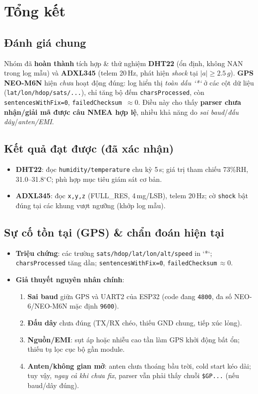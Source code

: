 \section{Tổng kết}

\subsection*{Đánh giá chung}
Nhóm đã \textbf{hoàn thành} tích hợp \& thử nghiệm \textbf{DHT22} (ổn định, không NAN trong log mẫu) và \textbf{ADXL345} (telem 20\,Hz, phát hiện \emph{shock} tại $|a|\ge 2.5\,g$). 
\textbf{GPS NEO-M6N} hiện \emph{chưa} hoạt động đúng: log hiển thị \emph{toàn dấu `*`} ở các cột dữ liệu (\texttt{lat/lon/hdop/sats/...}), chỉ tăng bộ đếm \texttt{charsProcessed}, còn \texttt{sentencesWithFix=0}, \texttt{failedChecksum\,$\approx 0$}. 
Điều này cho thấy \textbf{parser chưa nhận/giải mã được câu NMEA hợp lệ}, nhiều khả năng do \emph{sai baud}/\emph{đấu dây}/\emph{anten/EMI}.

\subsection*{Kết quả đạt được (đã xác nhận)}
\begin{itemize}
  \item \textbf{DHT22}: đọc \texttt{humidity/temperature} chu kỳ 5\,s; giá trị tham chiếu 73\%RH, 31.0--31.8$^\circ$C; phù hợp mục tiêu giám sát cơ bản.
  \item \textbf{ADXL345}: đọc \texttt{x,y,z} (FULL\_RES, 4\,mg/LSB), telem 20\,Hz; cờ \texttt{shock} bật đúng tại các khung vượt ngưỡng (khớp log mẫu).
\end{itemize}

\subsection*{Sự cố tồn tại (GPS) \& chẩn đoán hiện tại}
\begin{itemize}
  \item \textbf{Triệu chứng}: các trường \texttt{sats/hdop/lat/lon/alt/speed} in `*`; \texttt{charsProcessed} tăng dần; \texttt{sentencesWithFix=0}, \texttt{failedChecksum}\,$\approx 0$.
  \item \textbf{Giả thuyết nguyên nhân chính}:
  \begin{enumerate}
    \item \textbf{Sai baud} giữa GPS và UART2 của ESP32 (code đang \texttt{4800}, đa số NEO-6/NEO-M6N mặc định \texttt{9600}).
    \item \textbf{Đấu dây} chưa đúng (TX/RX chéo, thiếu GND chung, tiếp xúc lỏng).
    \item \textbf{Nguồn/EMI}: sụt áp hoặc nhiễu cao tần làm GPS khởi động bất ổn; thiếu tụ lọc cục bộ gần module.
    \item \textbf{Anten/không gian mở}: anten chưa thoáng bầu trời, cold start kéo dài; tuy vậy, \emph{ngay cả khi chưa fix}, parser vẫn phải thấy chuỗi \texttt{\$GP...} (nếu baud/dây đúng).
  \end{enumerate}
\end{itemize}

